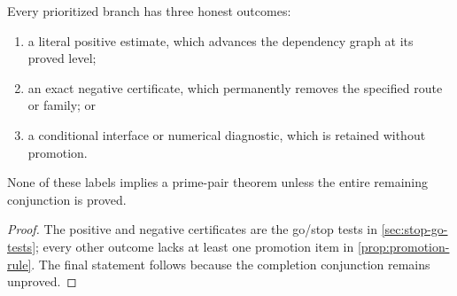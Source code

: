\begin{proposition}
\label{prop:roadmap-trichotomy}
Every prioritized branch has three honest outcomes:
\begin{enumerate}[label=(\roman*),leftmargin=2.2em]
\item a literal positive estimate, which advances the dependency
  graph at its proved level;
\item an exact negative certificate, which permanently removes the
  specified route or family; or
\item a conditional interface or numerical diagnostic, which is
  retained without promotion.
\end{enumerate}
None of these labels implies a prime-pair theorem unless the entire
remaining conjunction is proved.
\end{proposition}

\begin{proof}
The positive and negative certificates are the go/stop tests in
\cref{sec:stop-go-tests}; every other outcome lacks at least one
promotion item in \cref{prop:promotion-rule}.  The final statement
follows because the completion conjunction remains unproved.
\end{proof}
